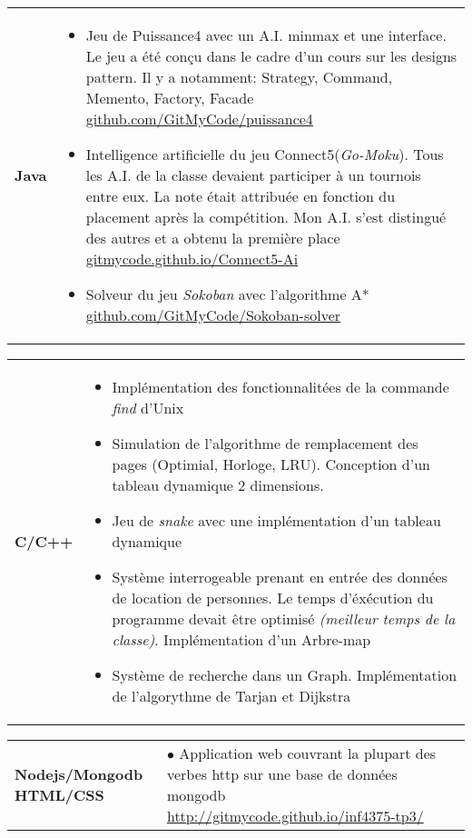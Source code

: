 \documentclass[a4paper,10pt]{extarticle}
\makeatletter
\newlength{\indicewidth}%
\newlength{\separatorcolumnwidth}%
\newlength{\maincolumnwidth}%
\newlength{\spacecvline}%
\newcommand{\cvdetailitem}[3][\spacecvline]{
\noindent\begin{tabular}
{@{}p{\indicewidth}@{\hspace{\separatorcolumnwidth}} p{\maincolumnwidth}@{}}
	\raggedright{\bf{#2}} &{ #3}%
\end{tabular}%
\vspace{-0.9em}\par\addvspace{#1}  }
\newcommand{\cvdetaillist}[3][.25em]{}
\renewcommand{\cvdetaillist}[3][.25em]{%
  \cvdetailitem[#1]{#2}{#3}}
\makeatother
\begin{document}
\cvdetaillist{Java}{
\begin{itemize}\setlength{\itemsep}{1pt}
  \setlength{\parskip}{5pt}
  \setlength{\parsep}{0pt}
\item Jeu de Puissance4 avec un A.I. minmax et une interface. Le jeu a été conçu dans le cadre d'un cours sur les designs pattern. Il y a notamment: Strategy, Command, Memento, Factory, Facade \small \href{https://github.com/GitMyCode/puissance4}{github.com/GitMyCode/puissance4}
\item Intelligence artificielle du jeu Connect5(\textit{Go-Moku}). Tous les A.I. de la classe devaient participer à un tournois entre eux. La note était attribuée en fonction du placement après la compétition. Mon A.I. s'est distingué des autres et a obtenu la première place   \small \href{http://gitmycode.github.io/Connect5-Ai/}{gitmycode.github.io/Connect5-Ai} 

\item Solveur du jeu \emph{Sokoban} avec l'algorithme A*  \small \href{https://github.com/GitMyCode/Sokoban-solver}{github.com/GitMyCode/Sokoban-solver}


\end{itemize}
}

\cvdetaillist{C/C++}{
\begin{itemize}\setlength{\itemsep}{1pt}
  \setlength{\parskip}{5pt}
  \setlength{\parsep}{0pt}
\item Implémentation des fonctionnalitées de la commande \emph{find} d'Unix
\item Simulation de l'algorithme de remplacement des pages (Optimial, Horloge, LRU). Conception d'un tableau dynamique 2 dimensions.

\item Jeu de \emph{snake} avec une implémentation d'un tableau dynamique
\item Système interrogeable prenant en entrée des données de location de personnes. Le temps d'éxécution du programme devait être optimisé \emph{(meilleur temps de la classe)}. Implémentation d'un Arbre-map
\item Système de recherche dans un Graph. Implémentation de l'algorythme de Tarjan et Dijkstra
\end{itemize}
}
\cvdetaillist{\small Nodejs/Mongodb HTML/CSS}{$\bullet$ Application web couvrant la plupart des verbes http sur une base de données mongodb   \newline\small{\href{http://gitmycode.github.io/inf4375-tp3/}{http://gitmycode.github.io/inf4375-tp3/}}}
\vspace{1em}\par
\end{document}
